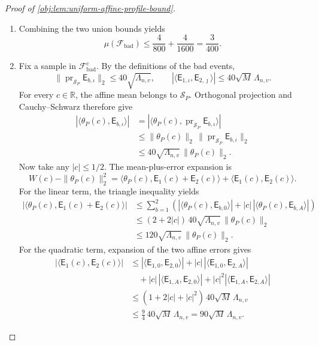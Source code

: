 \documentclass[11pt]{article}
\begin{document}
\begin{proof}[Proof of \cref{obj:lem:uniform-affine-profile-bound}]
\begin{enumerate}
\item
Combining the two union bounds yields
\[
\mu(\mathcal F_{\mathrm{bad}})
\le
\frac4{800}+\frac4{1600}
=
\frac3{400}.
\]

\item
Fix a sample in \(\mathcal F_{\mathrm{bad}}^c\). By the definitions of the bad events,
\[
\|\operatorname{pr}_{\mathcal S_P}\mathsf E_{b,\iota}\|_2
\le40\sqrt{\Lambda_{n,v}},
\qquad
|\langle\mathsf E_{1,\iota},\mathsf E_{2,\jmath}\rangle|
\le40\sqrt M\,\Lambda_{n,v}.
\]
For every \(c\in\mathbb R\), the affine mean belongs to \(\mathcal S_P\). Orthogonal projection and Cauchy--Schwarz therefore give
\[
\begin{aligned}
|\langle\theta_P(c),\mathsf E_{b,\iota}\rangle|
&=
|\langle\theta_P(c),
\operatorname{pr}_{\mathcal S_P}\mathsf E_{b,\iota}\rangle|\\
&\le
\|\theta_P(c)\|_2\,
\|\operatorname{pr}_{\mathcal S_P}\mathsf E_{b,\iota}\|_2\\
&\le
40\sqrt{\Lambda_{n,v}}\,\|\theta_P(c)\|_2.
\end{aligned}
\]
Now take any \(|c|\le1/2\). The mean-plus-error expansion is
\[
W(c)-\|\theta_P(c)\|_2^2
=
\langle\theta_P(c),\mathsf E_1(c)+\mathsf E_2(c)\rangle
+
\langle\mathsf E_1(c),\mathsf E_2(c)\rangle.
\]
For the linear term, the triangle inequality yields
\[
\begin{aligned}
|\langle\theta_P(c),\mathsf E_1(c)+\mathsf E_2(c)\rangle|
&\le
\sum_{b=1}^{2}
\left(
|\langle\theta_P(c),\mathsf E_{b,0}\rangle|
+
|c|\,|\langle\theta_P(c),\mathsf E_{b,A}\rangle|
\right)\\
&\le
(2+2|c|)\,40\sqrt{\Lambda_{n,v}}\,\|\theta_P(c)\|_2\\
&\le
120\sqrt{\Lambda_{n,v}}\,\|\theta_P(c)\|_2.
\end{aligned}
\]
For the quadratic term, expansion of the two affine errors gives
\[
\begin{aligned}
|\langle\mathsf E_1(c),\mathsf E_2(c)\rangle|
&\le
|\langle\mathsf E_{1,0},\mathsf E_{2,0}\rangle|
+
|c|\,|\langle\mathsf E_{1,0},\mathsf E_{2,A}\rangle|\\
&\quad+
|c|\,|\langle\mathsf E_{1,A},\mathsf E_{2,0}\rangle|
+
|c|^2|\langle\mathsf E_{1,A},\mathsf E_{2,A}\rangle|\\
&\le
(1+2|c|+|c|^2)\,40\sqrt M\,\Lambda_{n,v}\\
&\le
\frac94\,40\sqrt M\,\Lambda_{n,v}
=
90\sqrt M\,\Lambda_{n,v}.
\end{aligned}
\]
\end{enumerate}
\end{proof}
\end{document}
